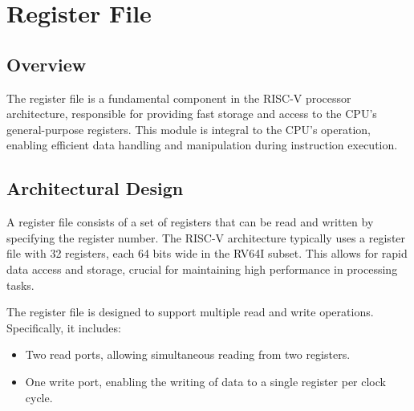 \section{Register File}

\subsection{Overview}
The register file is a fundamental component in the RISC-V processor architecture, responsible for providing fast storage and access to the CPU's general-purpose registers. This module is integral to the CPU's operation, enabling efficient data handling and manipulation during instruction execution.

\subsection{Architectural Design}
A register file consists of a set of registers that can be read and written by specifying the register number. The RISC-V architecture typically uses a register file with 32 registers, each 64 bits wide in the RV64I subset. This allows for rapid data access and storage, crucial for maintaining high performance in processing tasks.

The register file is designed to support multiple read and write operations. Specifically, it includes:
\begin{itemize}
    \item Two read ports, allowing simultaneous reading from two registers.
    \item One write port, enabling the writing of data to a single register per clock cycle.
\end{itemize}

